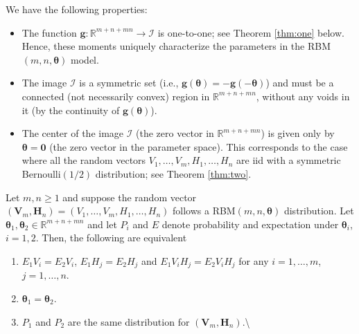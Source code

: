 \documentclass[12pt]{article}
\providecommand{\tightlist}{%
  \setlength{\itemsep}{0pt}\setlength{\parskip}{0pt}}
\theoremstyle{definition}
\newcommand{\E}{E}
\let\BeginKnitrBlock\begin \let\EndKnitrBlock\end
\begin{document}
We have the following properties:
\begin{itemize}
\tightlist
\item
  The function \(\bm{g}: \mathbb{R}^{m+n+mn} \rightarrow \mathcal{I}\)
  is one-to-one; see Theorem \ref{thm:one} below. Hence, these moments
  uniquely characterize the parameters in the RBM\((m,n,\bm{\theta})\)
  model.
\item
  The image \(\mathcal{I}\) is a symmetric set (i.e.,
  \(\bm{g}(\bm{\theta})=-\bm{g}(-\bm{\theta})\)) and must be a connected
  (not necessarily convex) region in \(\mathbb{R}^{m+n+mn}\), without
  any voids in it (by the continuity of \(\bm{g}(\bm{\theta})\)).
\item
  The center of the image \(\mathcal{I}\) (the zero vector in
  \(\mathbb{R}^{m+n+mn}\)) is given only by \(\bm{\theta}=\bm{0}\) (the
  zero vector in the parameter space). This corresponds to the case
  where all the random vectors \(V_1,\ldots,V_m,H_1,\ldots,H_n\) are iid
  with a symmetric Bernoulli\((1/2)\) distribution; see Theorem
  \ref{thm:two}.
\end{itemize}
\BeginKnitrBlock{theorem}
\protect\hypertarget{thm:one}{}{\label{thm:one}}Let \(m,n\geq 1\) and
suppose the random vector
\((\bm{V}_m,\bm{H}_n) = (V_1,\ldots,V_m, H_1,\ldots,H_n)\) follows a
RBM\((m,n,\bm{\theta})\) distribution. Let
\(\bm{\theta}_1,\bm{\theta}_2 \in \mathbb{R}^{m+n+mn}\) and let \(P_i\)
and \(\E\) denote probability and expectation under \(\bm{\theta}_i\),
\(i=1,2\). Then, the following are equivalent
\begin{enumerate}
\def\labelenumi{\arabic{enumi}.}
\tightlist
\item
  \(\E_1 V_i=\E_2 V_i\), \(\E_1 H_j=\E_2 H_j\) and
  \(\E_1 V_i H_j =\E_2 V_i H_j\) for any \(i=1,\ldots,m\),
  \(j=1,\ldots,n\).
\item
  \(\bm{\theta}_1 =\bm{\theta}_2\).
\item
  \(P_1\) and \(P_2\) are the same distribution for
  \((\bm{V}_m,\bm{H}_n)\).\textbackslash{}
\end{enumerate}
\EndKnitrBlock{theorem}
\end{document}
